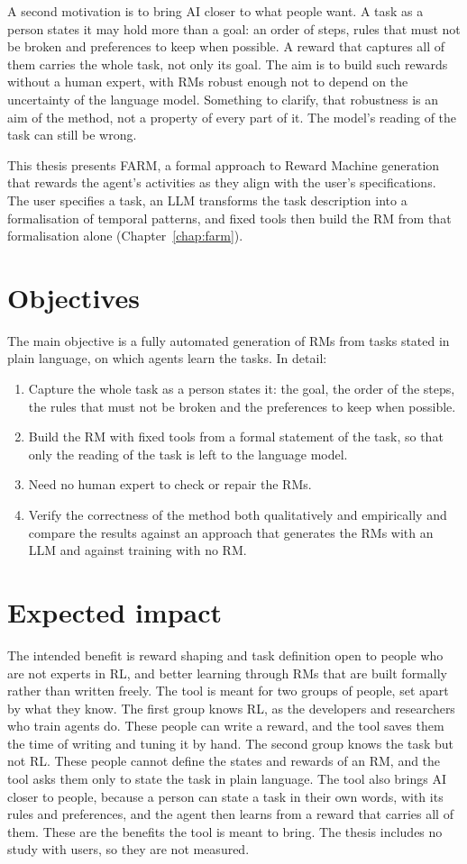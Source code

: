 \documentclass[11pt,english,listoffigures,listoftables]{tfgetsinf}
\begin{document}
A second motivation is to bring AI closer to what people want. A task as a person states it may hold more than a goal: an order of steps, rules that must not be broken and preferences to keep when possible. A reward that captures all of them carries the whole task, not only its goal. The aim is to build such rewards without a human expert, with RMs robust enough not to depend on the uncertainty of the language model. Something to clarify, that robustness is an aim of the method, not a property of every part of it. The model's reading of the task can still be wrong.

This thesis presents FARM, a formal approach to Reward Machine generation that rewards the agent's activities as they align with the user's specifications. The user specifies a task, an LLM transforms the task description into a formalisation of temporal patterns, and fixed tools then build the RM from that formalisation alone (Chapter~\ref{chap:farm}).

\section{Objectives}
The main objective is a fully automated generation of RMs from tasks stated in plain language, on which agents learn the tasks. In detail:
\begin{enumerate}
    \item Capture the whole task as a person states it: the goal, the order of the steps, the rules that must not be broken and the preferences to keep when possible.
    \item Build the RM with fixed tools from a formal statement of the task, so that only the reading of the task is left to the language model.
    \item Need no human expert to check or repair the RMs.
    \item Verify the correctness of the method both qualitatively and empirically and compare the results against an approach that generates the RMs with an LLM \cite{creus2026armfm} and against training with no RM.
\end{enumerate}

\section{Expected impact}
The intended benefit is reward shaping and task definition open to people who are not experts in RL, and better learning through RMs that are built formally rather than written freely. The tool is meant for two groups of people, set apart by what they know. The first group knows RL, as the developers and researchers who train agents do. These people can write a reward, and the tool saves them the time of writing and tuning it by hand. The second group knows the task but not RL. These people cannot define the states and rewards of an RM, and the tool asks them only to state the task in plain language. The tool also brings AI closer to people, because a person can state a task in their own words, with its rules and preferences, and the agent then learns from a reward that carries all of them. These are the benefits the tool is meant to bring. The thesis includes no study with users, so they are not measured.
\end{document}
